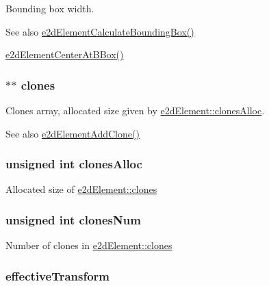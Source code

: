 Bounding box width. \begin{DoxySeeAlso}{See also}
\hyperlink{group__e2dElement_ga575c7363927670f1ea8c52b7ea23fcd5}{e2d\-Element\-Calculate\-Bounding\-Box()} 

\hyperlink{group__e2dElement_gab829b280fa22a3509c40425fc84b5061}{e2d\-Element\-Center\-At\-B\-Box()} 
\end{DoxySeeAlso}
\hypertarget{structe2dElement_a4347bc7eb8d31d574115ef75ae074bb7}{
\subsubsection[{clones}]{$\ast$$\ast$ {\bf clones}}}\label{structe2dElement_a4347bc7eb8d31d574115ef75ae074bb7}
Clones array, allocated size given by \hyperlink{structe2dElement_a4bdf6d903ed95cd67debbba1ef3dbdae}{e2d\-Element\-::clones\-Alloc}. \begin{DoxySeeAlso}{See also}
\hyperlink{group__e2dElement_ga80b7a45c28ec6e95d97b0316358a3290}{e2d\-Element\-Add\-Clone()} 
\end{DoxySeeAlso}
\hypertarget{structe2dElement_a4bdf6d903ed95cd67debbba1ef3dbdae}{
\subsubsection[{clones\-Alloc}]{\setlength{\rightskip}{0pt plus 5cm}unsigned int {\bf clones\-Alloc}}}\label{structe2dElement_a4bdf6d903ed95cd67debbba1ef3dbdae}
Allocated size of \hyperlink{structe2dElement_a4347bc7eb8d31d574115ef75ae074bb7}{e2d\-Element\-::clones} \hypertarget{structe2dElement_ab4c733639f1fdab67f8d25a1439a8b1a}{
\subsubsection[{clones\-Num}]{\setlength{\rightskip}{0pt plus 5cm}unsigned int {\bf clones\-Num}}}\label{structe2dElement_ab4c733639f1fdab67f8d25a1439a8b1a}
Number of clones in \hyperlink{structe2dElement_a4347bc7eb8d31d574115ef75ae074bb7}{e2d\-Element\-::clones} \hypertarget{structe2dElement_a6c8e26945f09b5157e2111e42f99b879}{
\subsubsection[{effective\-Transform}]{ {\bf effective\-Transform}}}\label{structe2dElement_a6c8e26945f09b5157e2111e42f99b879}
